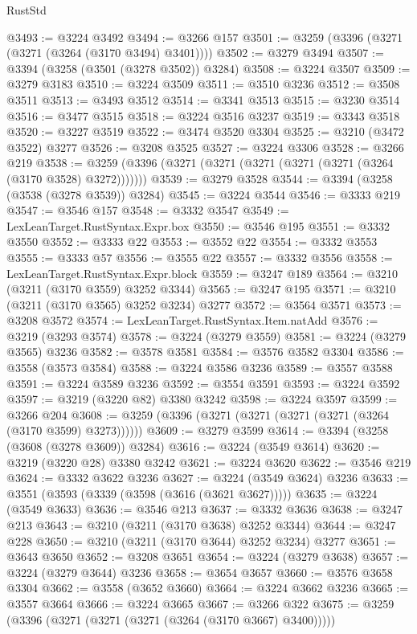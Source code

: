\begin{lexlean}{RustStd}
\begin{coremodule}
@3493 := @3224 @3492
@3494 := @3266 @157
@3501 := @3259 (@3396 (@3271 (@3271 (@3264 (@3170 @3494) @3401))))
@3502 := @3279 @3494
@3507 := @3394 (@3258 (@3501 (@3278 @3502)) @3284)
@3508 := @3224 @3507
@3509 := @3279 @3183
@3510 := @3224 @3509
@3511 := @3510 @3236
@3512 := @3508 @3511
@3513 := @3493 @3512
@3514 := @3341 @3513
@3515 := @3230 @3514
@3516 := @3477 @3515
@3518 := @3224 @3516 @3237
@3519 := @3343 @3518
@3520 := @3227 @3519
@3522 := @3474 @3520 @3304
@3525 := @3210 (@3472 @3522) @3277
@3526 := @3208 @3525
@3527 := @3224 @3306
@3528 := @3266 @219
@3538 := @3259 (@3396 (@3271 (@3271 (@3271 (@3271 (@3271 (@3264 (@3170 @3528) @3272)))))))
@3539 := @3279 @3528
@3544 := @3394 (@3258 (@3538 (@3278 @3539)) @3284)
@3545 := @3224 @3544
@3546 := @3333 @219
@3547 := @3546 @157
@3548 := @3332 @3547
@3549 := LexLeanTarget.RustSyntax.Expr.box
@3550 := @3546 @195
@3551 := @3332 @3550
@3552 := @3333 @22
@3553 := @3552 @22
@3554 := @3332 @3553
@3555 := @3333 @57
@3556 := @3555 @22
@3557 := @3332 @3556
@3558 := LexLeanTarget.RustSyntax.Expr.block
@3559 := @3247 @189
@3564 := @3210 (@3211 (@3170 @3559) @3252 @3344)
@3565 := @3247 @195
@3571 := @3210 (@3211 (@3170 @3565) @3252 @3234) @3277
@3572 := @3564 @3571
@3573 := @3208 @3572
@3574 := LexLeanTarget.RustSyntax.Item.natAdd
@3576 := @3219 (@3293 @3574)
@3578 := @3224 (@3279 @3559)
@3581 := @3224 (@3279 @3565) @3236
@3582 := @3578 @3581
@3584 := @3576 @3582 @3304
@3586 := @3558 (@3573 @3584)
@3588 := @3224 @3586 @3236
@3589 := @3557 @3588
@3591 := @3224 @3589 @3236
@3592 := @3554 @3591
@3593 := @3224 @3592
@3597 := @3219 (@3220 @82) @3380 @3242
@3598 := @3224 @3597
@3599 := @3266 @204
@3608 := @3259 (@3396 (@3271 (@3271 (@3271 (@3271 (@3264 (@3170 @3599) @3273))))))
@3609 := @3279 @3599
@3614 := @3394 (@3258 (@3608 (@3278 @3609)) @3284)
@3616 := @3224 (@3549 @3614)
@3620 := @3219 (@3220 @28) @3380 @3242
@3621 := @3224 @3620
@3622 := @3546 @219
@3624 := @3332 @3622 @3236
@3627 := @3224 (@3549 @3624) @3236
@3633 := @3551 (@3593 (@3339 (@3598 (@3616 (@3621 @3627)))))
@3635 := @3224 (@3549 @3633)
@3636 := @3546 @213
@3637 := @3332 @3636
@3638 := @3247 @213
@3643 := @3210 (@3211 (@3170 @3638) @3252 @3344)
@3644 := @3247 @228
@3650 := @3210 (@3211 (@3170 @3644) @3252 @3234) @3277
@3651 := @3643 @3650
@3652 := @3208 @3651
@3654 := @3224 (@3279 @3638)
@3657 := @3224 (@3279 @3644) @3236
@3658 := @3654 @3657
@3660 := @3576 @3658 @3304
@3662 := @3558 (@3652 @3660)
@3664 := @3224 @3662 @3236
@3665 := @3557 @3664
@3666 := @3224 @3665
@3667 := @3266 @322
@3675 := @3259 (@3396 (@3271 (@3271 (@3271 (@3264 (@3170 @3667) @3400)))))

\end{coremodule}
\end{lexlean}
